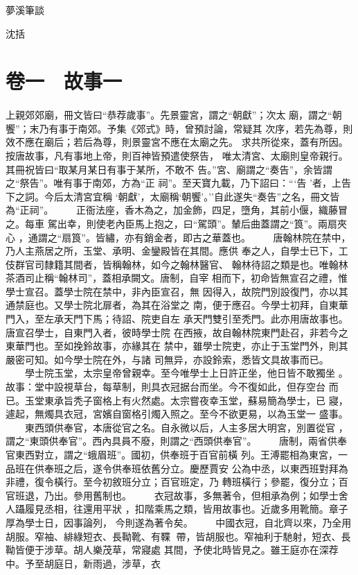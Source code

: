 \documentclass{ctexart}
\begin{document}
\vspace*{\fill}
\Huge
\begin{center}
夢溪筆談
\end{center}
\bigskip
\begin{center}
沈括
\end{center}
\vspace*{\fill}
\clearpage
\normalsize
\tableofcontents
\clearpage
\large
{}
\section{卷一　故事一}
\paragraph{}
上親郊郊廟，冊文皆曰``恭荐歲事''。先景靈宮，謂之``朝獻''；次太 廟，謂之``朝饗''；末乃有事于南郊。予集《郊式》時，曾預討論，常疑其 次序，若先為尊，則效不應在廟后；若后為尊，則景靈宮不應在太廟之先。 求共所從來，蓋有所因。按唐故事，凡有事地上帝，則百神皆預遣使祭告， 唯太清宮、太廟則皇帝親行。其冊祝皆曰``取某月某日有事于某所，不敢不 告。''宮、廟謂之``奏告''，余皆謂之``祭告''。唯有事于南郊，方為``正 祠''。至天寶九載，乃下詔曰：```告 '者，上告下之詞。今后太清宮宜稱 `朝獻'，太廟稱`朝饗'。''自此遂失``奏告''之名，冊文皆為``正祠''。 　　正衙法座，香木為之，加金飾，四足，墮角，其前小偃，織藤冒之。每車 駕出幸，則使老內臣馬上抱之，曰``駕頭''。輦后曲蓋謂之``筤''。兩扇夾心 ，通謂之``扇筤''。皆繡，亦有銷金者，即古之華蓋也。 　　唐翰林院在禁中，乃人主燕居之所，玉堂、承明、金鑾殿皆在其間。應供 奉之人，自學士已下，工伎群官司隸籍其間者，皆稱翰林，如今之翰林醫官、 翰林待詔之類是也。唯翰林茶酒司止稱``翰林司''，蓋相承闕文。唐制，自宰 相而下，初命皆無宣召之禮，惟學士宣召。蓋學士院在禁中，非內臣宣召，無 因得入，故院門別設復門，亦以其通禁庭也。又學士院北扉者，為其在浴堂之 南，便于應召。今學士初拜，自東華門入，至左承天門下馬；待詔、院吏自左 承天門雙引至秃門。此亦用唐故事也。唐宣召學士，自東門入者，彼時學士院 在西掖，故自翰林院東門赴召，非若今之東華門也。至如挽鈴故事，亦緣其在 禁中，雖學士院吏，亦止于玉堂門外，則其嚴密可知。如今學士院在外，与諸 司無异，亦設鈴索，悉皆文具故事而已。 　　學士院玉堂，太宗皇帝曾親幸。至今唯學士上日許正坐，他日皆不敢獨坐 。故事：堂中設視草台，每草制，則具衣冠据台而坐。今不復如此，但存空台 而已。玉堂東承旨秃子窗格上有火然處。太宗嘗夜幸玉堂，蘇易簡為學士，已 寢，遽起，無燭具衣冠，宮嬪自窗格引燭入照之。至今不欲更易，以為玉堂一 盛事。 　　東西頭供奉官，本唐從官之名。自永微以后，人主多居大明宮，別置從官 ，謂之``東頭供奉官''。西內具員不廢，則謂之``西頭供奉官''。 　　唐制，兩省供奉官東西對立，謂之``蛾眉班''。國初，供奉班于百官前橫 列。王溥罷相為東宮，一品班在供奉班之后，遂令供奉班依舊分立。慶歷賈安 公為中丞，以東西班對拜為非禮，復令橫行。至今初敘班分立；百官班定，乃 轉班橫行；參罷，復分立；百官班退，乃出。參用舊制也。 　　衣冠故事，多無著令，但相承為例；如學士舍人躡履見丞相，往還用平狀 ，扣階乘馬之類，皆用故事也。近歲多用靴簡。章子厚為學士日，因事論列， 今則遂為著令矣。 　　中國衣冠，自北齊以來，乃全用胡服。窄袖、緋綠短衣、長靿靴、有鞢 帶，皆胡服也。窄袖利于馳射，短衣、長靿皆便于涉草。胡人樂茂草，常寢處 其間，予使北時皆見之。雖王庭亦在深荐中。予至胡庭日，新雨過，涉草，衣 
\end{document}
